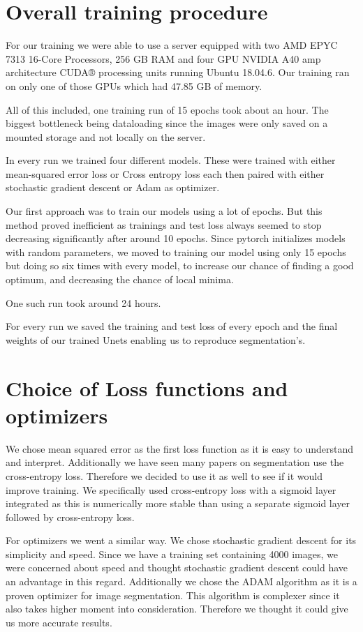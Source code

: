 \section{Overall training procedure}

For our training we were able to use a server equipped with two AMD EPYC 7313 16-Core Processors, 256 GB RAM and four GPU NVIDIA A40 amp architecture CUDA® processing units running Ubuntu 18.04.6.
Our training ran on only one of those GPUs which had 47.85 GB of memory.

All of this included, one training run of 15 epochs took about an hour. The biggest bottleneck being dataloading since the images were only saved on a mounted storage and not locally on the server.

In every run we trained four different models. These were trained with either mean-squared error loss or Cross entropy loss each then paired with either stochastic gradient descent or Adam as optimizer.

Our first approach was to train our models using a lot of epochs. But this method proved inefficient as trainings and test loss always seemed to stop decreasing significantly after around 10 epochs.
Since pytorch initializes models with random parameters, we moved to training our model using only 15 epochs but doing so six times with every model, to increase our chance of finding a good optimum, and decreasing the chance of local minima.

One such run took around 24 hours.

For every run we saved the training and test loss of every epoch and the final weights of our trained Unets enabling us to reproduce segmentation's.

\vspace{3 em}
\section{Choice of Loss functions and optimizers}
We chose mean squared error as the first loss function as it is easy to understand and interpret. Additionally we have seen many papers on segmentation use the cross-entropy loss.
Therefore we decided to use it as well to see if it would improve training. We specifically used cross-entropy loss with a sigmoid layer integrated as this is numerically more stable than using a separate sigmoid layer followed by cross-entropy loss.

For optimizers we went a similar way. We chose stochastic gradient descent for its simplicity and speed. Since we have a training set containing 4000 images, we were concerned about speed and thought stochastic gradient descent could have an advantage in this regard.
Additionally we chose the ADAM algorithm as it is a proven optimizer for image segmentation. This algorithm is complexer since it also takes higher moment into consideration.
Therefore we thought it could give us more accurate results.

